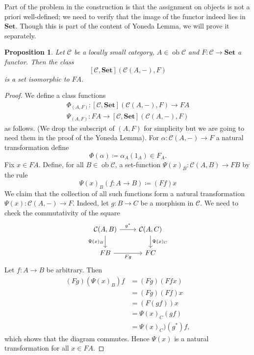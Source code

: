 \documentclass{report}
\newcommand{\mbold}[1]{\mathrm{\mathbf{#1}}}
\DeclareMathOperator{\ob}{ob}
\theoremstyle{definition}
\theoremstyle{plain}
\newtheorem{prop}[thm]{Proposition}
\theoremstyle{definition}
\begin{document}
		Part of the problem in the construction is that the assignment on objects is not a priori well-defined; we need to verify that the image of the functor indeed lies in $\mbold{Set}$. Though this is part of the content of Yoneda Lemma, we will prove it separately. 
		\begin{prop}\label{prop:yone_no_nat}
			Let $\mathcal{C}$ be a locally small category, $A\in\ob\mathcal{C}$ and $F\colon\mathcal{C}\to\mbold{Set}$ a functor. Then the class
			\[
				[\mathcal{C},\mbold{Set}](\mathcal{C}(A,-),F)
			\]
			is a set isomorphic to $FA$.
		\end{prop}
		\begin{proof}
			We define a class functions 
			\begin{gather*}
				\Phi_{(A,F)} \colon [\mathcal{C},\mbold{Set}](\mathcal{C}(A,-),F) \to FA\\[6pt]
				\Psi_{(A,F)}\colon  FA\to [\mathcal{C},\mbold{Set}](\mathcal{C}(A,-),F)
			\end{gather*}
			as follows. (We drop the subscript of $(A,F)$ for simplicity but we are going to need them in the proof of the Yoneda Lemma). For $\alpha\colon \mathcal{C}(A,-)\to F$ a natural transformation define 
			\[\Phi(\alpha) \coloneqq \alpha_A(1_A)\in F_A.\]
			Fix $x\in FA$. Define, for all $B\in\ob\mathcal{C}$, a set-function $\Psi(x)_B \colon \mathcal{C}(A,B)\to FB$ by the rule
			\[
				\Psi(x)_B(f\colon A \to B) \coloneqq (Ff)x
			\]
			We claim that the collection of all such functions form a natural transformation $\Psi(x) \colon \mathcal{C}(A,-)\to F$. Indeed, let $g\colon B \to C$ be a morphism in $\mathcal{C}$. We need to check the commutativity of the square
			\[\begin{tikzcd}
				{\mathcal{C}(A,B)} & {\mathcal{C}(A,C)} \\
				FB & FC
				\arrow["{g^*}", from=1-1, to=1-2]
				\arrow["Fg"', from=2-1, to=2-2]
				\arrow["{\Psi(x)_B}"', from=1-1, to=2-1]
				\arrow["{\Psi(x)_C}", from=1-2, to=2-2]
			\end{tikzcd}\]
			Let $f\colon A \to B$ be arbitrary. Then
			\begin{align*}
				(Fg)(\Psi(x)_B)f &= (Fg)(Ffx) \\
				&= (Fg)(Ff)x \\
				&= (F(gf))x \\
				&= \Psi(x)_C(gf) \\
				&= \Psi(x)_C)(g^*)f,
			\end{align*}
			which shows that the diagram commutes. Hence $\Psi(x)$ is a natural transformation for all $x\in FA$.
			

\end{proof}
\end{document}

